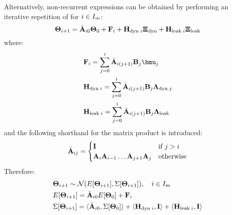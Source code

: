 Alternatively, non-recurrent expressions can be obtained by performing an iterative repetition of  for $i \in I_m$:
\begin{equation} \equlabel{tta-fourier-non-recurrent-process-variation}
  \vtemp_{i + 1} = \am{A}_{i0} \vtemp_0 + \v{F}_i + \m{H}_{\dyn \; i} \vnormal_\dyn + \m{H}_{\leak \; i} \vnormal_\leak
\end{equation}
where:
\begin{align}
  & \v{F}_i = \sum_{j = 0}^{i} \am{A}_{i(j+1)} \m{B}_j \vmean{j} \equlabel{f} \\
  & \m{H}_{\dyn \; i} = \sum_{j = 0}^i \am{A}_{i(j + 1)} \m{B}_j \ddev{\dyn \; j} \equlabel{h-dynamic} \\
  & \m{H}_{\leak \; i} = \sum_{j = 0}^i \am{A}_{i(j + 1)} \m{B}_j \ddev{\leak} \equlabel{h-leakage}
\end{align}
and the following shorthand for the matrix product is introduced:
\[
  \Bar{\mathbf{A}}_{ij} = \begin{cases}
    \mathbf{I} & \mbox{if } j > i \\
    \mathbf{A}_i \mathbf{A}_{i - 1} \dots \mathbf{A}_{j + 1} \mathbf{A}_j & \mbox{otherwise}
  \end{cases}
\]
Therefore:
\begin{align}
  & \vtemp_{i + 1} \sim \normal(\expect{\vtemp_{i + 1}}, \cov{\vtemp_{i + 1}}), \sep i \in \timeindex \equlabel{tta-probabilistic-non-recurrent-process-variation} \\
  & \expect{\vtemp_{i + 1}} = \am{A}_{i0} \expect{\vtemp_0} + \v{F}_i \nonumber \\
  & \cov{\vtemp_{i + 1}} = \dbl{\am{A}_{i0}, \cov{\vtemp_0}} + \dbl{\m{H}_{\dyn \; i}, \mone} + \dbl{\m{H}_{\leak \; i}, \mone} \nonumber
\end{align}
